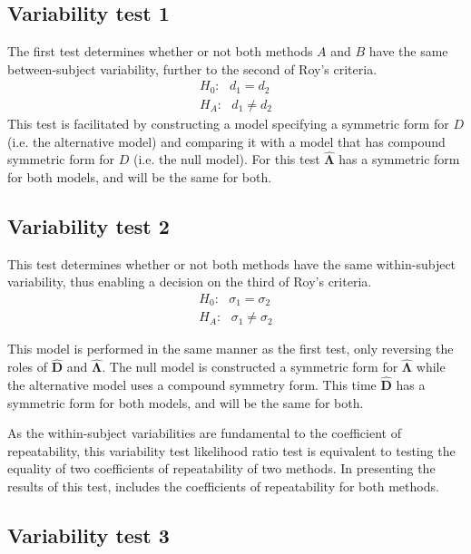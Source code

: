 \documentclass[12pt, a4paper]{report}
\theoremstyle{plain}
\theoremstyle{definition}
\theoremstyle{remark}
\begin{document}
	\subsection{Variability test 1}
	The first test determines whether or not both methods $A$ and $B$ have the same between-subject variability, further to the second of Roy's criteria.
	\begin{eqnarray*}
		H_{0}: \mbox{ }d_{1}  = d_{2} \\
		H_{A}: \mbox{ }d_{1}  \neq d_{2}
	\end{eqnarray*}
	This test is facilitated by constructing a model specifying a symmetric form for $D$ (i.e. the alternative model) and comparing it with a model that has compound symmetric form for $D$ (i.e. the null model). For this test $\boldsymbol{\hat{\Lambda}}$ has a symmetric form for both models, and will be the same for both.
	
	
	
	\subsection{Variability test 2}
	
	This test determines whether or not both methods have the same within-subject variability, thus enabling a decision on the third of Roy's criteria.
	\begin{eqnarray*}
		H_{0}: \mbox{ }\sigma_{1}  = \sigma_{2} \\
		H_{A}: \mbox{ }\sigma_{1}  \neq \sigma_{2}
	\end{eqnarray*}
	
	This model is performed in the same manner as the first test, only reversing the roles of $\boldsymbol{\hat{D}}$ and $\boldsymbol{\hat{\Lambda}}$. The null model is constructed a symmetric form for $\boldsymbol{\hat{\Lambda}}$ while the alternative model uses a compound symmetry form. This time $\boldsymbol{\hat{D}}$ has a symmetric form for both models, and will be the same for both.
	
	As the within-subject variabilities are fundamental to the coefficient of repeatability, this variability test likelihood ratio test is equivalent to testing the equality of two coefficients of repeatability of two methods. In presenting the results of this test, \citet{ARoy2009} includes the coefficients of repeatability for both methods.
	
	
	\subsection{Variability test 3}
	
\end{document}
